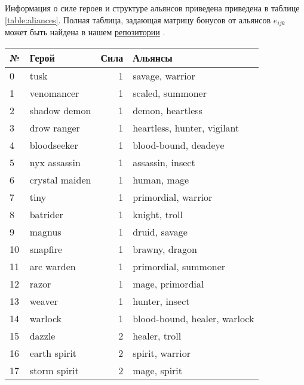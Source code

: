\documentclass{article}
\begin{document}
Информация о силе героев и структуре альянсов приведена приведена в таблице \ref{table:aliances}. 
Полная таблица, задающая матрицу бонусов от альянсов $e_{ijk}$ может быть найдена в нашем \href{https://github.com/aponom84/UnderLords/blob/master/UnderLordsData.xlsx}{репозитории} \cite{UnderLordsInput}.

\begin{table}
\center
\resizebox{!}{9cm} {
\begin{tabular}{llrl}
{№} &                 Герой &  Сила &                       Альянсы \\
\midrule
0  &                 tusk &      1 &               savage, warrior  \\
1  &           venomancer &      1 &               scaled, summoner \\
2  &         shadow demon &      1 &               demon, heartless \\
3  &          drow ranger &      1 &    heartless, hunter, vigilant \\
4  &          bloodseeker &      1 &           blood-bound, deadeye \\
5  &         nyx assassin &      1 &               assassin, insect \\
6  &       crystal maiden &      1 &                    human, mage \\
7  &                 tiny &      1 &           primordial, warrior  \\
8  &             batrider &      1 &                  knight, troll \\
9  &               magnus &      1 &                  druid, savage \\
10 &             snapfire &      1 &                 brawny, dragon \\
11 &           arc warden &      1 &           primordial, summoner \\
12 &                razor &      1 &               mage, primordial \\
13 &               weaver &      1 &                 hunter, insect \\
14 &              warlock &      1 &  blood-bound, healer, warlock  \\
15 &               dazzle &      2 &                  healer, troll \\
16 &         earth spirit &      2 &               spirit, warrior  \\
17 &         storm spirit &      2 &                   mage, spirit \\

\end{tabular}}
\end{table}
\end{document}
